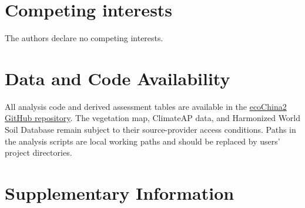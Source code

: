 \documentclass[11pt]{article}
\begin{document}
\section*{Competing interests}
The authors declare no competing interests.

\section*{Data and Code Availability}
All analysis code and derived assessment tables are available in the
\href{https://github.com/gingerlolipop/ecoChina2}{ecoChina2 GitHub repository}.
The vegetation map, ClimateAP data, and Harmonized World Soil Database remain
subject to their source-provider access conditions. Paths in the analysis
scripts are local working paths and should be replaced by users' project
directories.





\section{Supplementary Information}

\setcounter{table}{0}
\renewcommand{\thetable}{S\arabic{table}}
\setcounter{figure}{0}
\renewcommand{\thefigure}{S\arabic{figure}}
\end{document}

